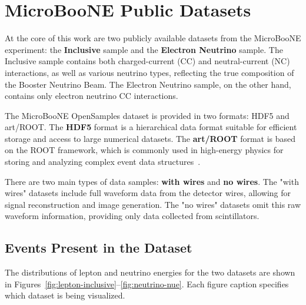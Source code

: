 \documentclass{pracalicmgr}
\begin{document}
\section{MicroBooNE Public Datasets}
At the core of this work are two publicly available datasets from the MicroBooNE experiment: the \textbf{Inclusive} sample and the \textbf{Electron Neutrino} sample. The Inclusive sample contains both charged-current (CC) and neutral-current (NC) interactions, as well as various neutrino types, reflecting the true composition of the Booster Neutrino Beam. The Electron Neutrino sample, on the other hand, contains only electron neutrino CC interactions.

The MicroBooNE OpenSamples dataset is provided in two formats: HDF5 and art/ROOT. The \textbf{HDF5} format is a hierarchical data format suitable for efficient storage and access to large numerical datasets. The \textbf{art/ROOT} format is based on the ROOT framework, which is commonly used in high-energy physics for storing and analyzing complex event data structures~\cite{hdf5,root}. 

There are two main types of data samples: \textbf{with wires} and \textbf{no wires}. The "with wires" datasets include full waveform data from the detector wires, allowing for signal reconstruction and image generation. The "no wires" datasets omit this raw waveform information, providing only data collected from scintillators.


\subsection{Events Present in the Dataset}

The distributions of lepton and neutrino energies for the two datasets are shown in Figures~\ref{fig:lepton-inclusive}--\ref{fig:neutrino-nue}. Each figure caption specifies which dataset is being visualized.
\end{document}
